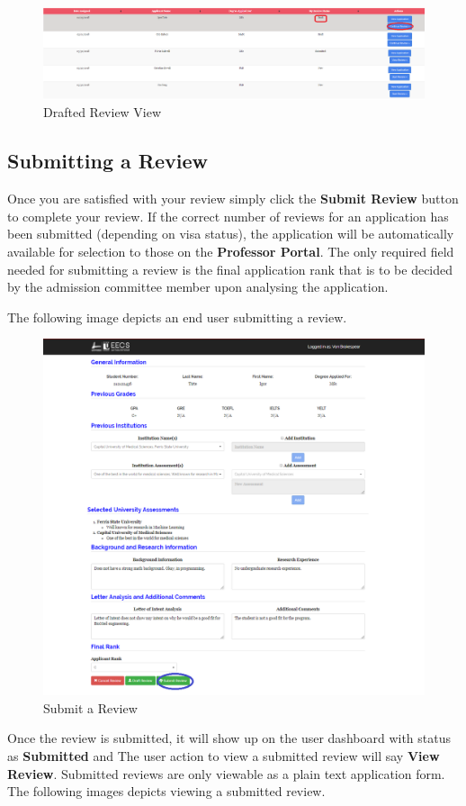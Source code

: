 \documentclass[fontsize=12pt,paper=letter,twoside]{scrartcl}
\begin{document}
\begin{figure}[!htb]
\begin{center}
\includegraphics[width=.9\textwidth]{images/drafted_review.png}
\end{center}
\caption{Drafted Review View}
\label{fig:drafted_review}
\end{figure}

\clearpage
\subsection{Submitting a Review}
Once you are satisfied with your review simply  click the \textbf{Submit Review} button to complete your review. If the correct number of reviews for an application has been submitted (depending on visa status), the application will be automatically available for selection to those on the \textbf{Professor Portal}. The only required field needed for submitting a review is the final application rank that is to be decided by the admission committee member upon analysing the application.

\bigskip
\noindent The following image depicts an end user submitting a review. 

\begin{figure}[!htb]
\begin{center}
\includegraphics[width=.8\textwidth]{images/submit_review.png}
\end{center}
\caption{Submit a Review}
\label{fig:submit_review}
\end{figure}
\clearpage
\bigskip
\noindent Once the review is submitted, it will show up on the user dashboard with status as \textbf{Submitted} and The user action to view a submitted review will say \textbf{View Review}. Submitted reviews are only viewable as a plain text application form. The following images depicts viewing a submitted review.
\end{document}
